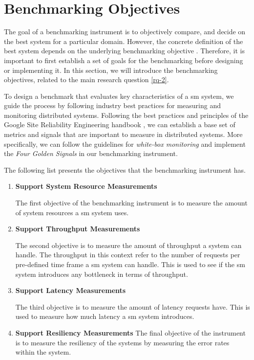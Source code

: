 \section{Benchmarking Objectives}
\label{sec:system:objectives}


The goal of a benchmarking instrument is to objectively compare, and decide on the best system for a particular domain. However, the concrete definition of the best system depends on the underlying benchmarking objective \cite{folkerts2012benchmarking}. Therefore, it is important to first establish a set of goals for the benchmarking before designing or implementing it. In this section, we will introduce the benchmarking objectives, related to the main research question \ref{rq-2}.

To design a benchmark that evaluates key characteristics of a \gls{sm} system, we guide the process by following industry best practices for measuring and monitoring distributed systems. Following the best practices and principles of the Google Site Reliability Engineering handbook \cite{google-sre}, we can establish a base set of metrics and signals that are important to measure in distributed systems. More specifically, we can follow the guidelines for \textit{white-box monitoring} and implement the  \textit{Four Golden Signals} in our benchmarking instrument.

The following list presents the objectives that the benchmarking instrument has.

\begin{enumerate}[label=\textbf{O\arabic*}, leftmargin=3\parindent]
    \item \textbf{Support System Resource Measurements}
    \label{o-1}
    
    The first objective of the benchmarking instrument is to measure the amount of system resources a \gls{sm} system uses.
    
    \item \textbf{Support Throughput Measurements}
    \label{o-2}
    
    The second objective is to measure the amount of throughput a system can handle. The throughput in this context refer to the number of requests per pre-defined time frame a \gls{sm} system can handle. This is used to see if the \gls{sm} system introduces any bottleneck in terms of throughput.

    \item \textbf{Support Latency Measurements}
    \label{o-3}
    
    The third objective is to measure the amount of latency requests have. This is used to measure how much latency a \gls{sm} system introduces.

    \item \textbf{Support Resiliency Measurements}
    \label{o-4}
    The final objective of the instrument is to measure the resiliency of the systems by measuring the error rates within the system.
    
\end{enumerate}
